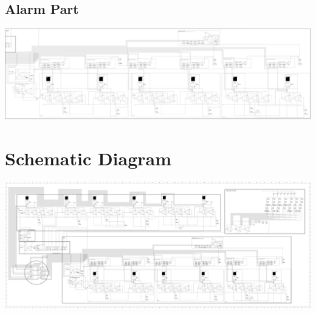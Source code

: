 \documentclass[12pt]{article}
\begin{document}
\subsection{Alarm Part}
\includegraphics[scale=0.55]{Alarm.png}

\clearpage

\section{Schematic Diagram}
\includegraphics[scale=0.18]{Simulation.png}\\
\end{document}
